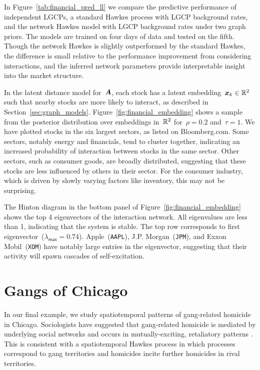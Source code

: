 In Figure~\ref{tab:financial_pred_ll} we compare the
predictive performance of independent LGCPs, a standard Hawkes process
with LGCP background rates, and the network Hawkes model with LGCP
background rates under two graph priors. The models are trained on
four days of data and tested on the fifth. Though the network Hawkes
is slightly outperformed by the standard Hawkes, the difference is
small relative to the performance improvement from considering
interactions, and the inferred network parameters provide
interpretable insight into the market structure.

In the latent distance model for~$\boldsymbol{A}$, each stock has a latent
embedding~${\boldsymbol{x}_k\in\mathbb{R}^2}$ such that nearby stocks are more likely
to interact, as described in
Section~\ref{sec:graph_models}. Figure~\ref{fig:financial_embedding}
shows a sample from the posterior distribution over embeddings
in~$\mathbb{R}^2$ for~${\rho=0.2}$ and~${\tau=1}$. We have plotted stocks
in the six largest sectors, as listed on Bloomberg.com. Some sectors,
notably energy and financials, tend to cluster together, indicating an
increased probability of interaction between stocks in the same
sector. Other sectors, such as consumer goods, are broadly
distributed, suggesting that these stocks are less influenced by
others in their sector. For the consumer industry, which is driven by
slowly varying factors like inventory, this may not be surprising.

The Hinton diagram in the bottom panel of
Figure~\ref{fig:financial_embedding} shows the top 4 eigenvectors of
the interaction network. All eigenvalues are less than 1, indicating
that the system is stable. The top row corresponds to first
eigenvector~(${\lambda_{\mathsf{max}}=0.74}$). Apple~(\texttt{AAPL}),
J.P. Morgan~(\texttt{JPM}), and Exxon Mobil~(\texttt{XOM}) have
notably large entries in the eigenvector, suggesting that their
activity will spawn cascades of self-excitation.

\section{Gangs of Chicago}
\label{sec:chicago}
In our final example, we study spatiotemporal patterns of gang-related
homicide in Chicago. Sociologists have suggested that gang-related
homicide is mediated by underlying social networks and occurs in
mutually-exciting, retaliatory patterns \cite{Papachristos-2009}. This
is consistent with a spatiotemporal Hawkes process in which processes
correspond to gang territories and homicides incite further homicides
in rival territories.


